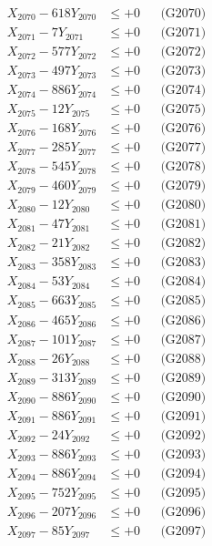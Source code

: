 \documentclass[a4paper,10pt]{article}
\begin{document}
{\begin{align}
X_{2070} - 618Y_{2070} &\leq +0 && \text{(G2070)} \\
\allowbreak
X_{2071} - 7Y_{2071} &\leq +0 && \text{(G2071)} \\
X_{2072} - 577Y_{2072} &\leq +0 && \text{(G2072)} \\
X_{2073} - 497Y_{2073} &\leq +0 && \text{(G2073)} \\
X_{2074} - 886Y_{2074} &\leq +0 && \text{(G2074)} \\
X_{2075} - 12Y_{2075} &\leq +0 && \text{(G2075)} \\
X_{2076} - 168Y_{2076} &\leq +0 && \text{(G2076)} \\
X_{2077} - 285Y_{2077} &\leq +0 && \text{(G2077)} \\
X_{2078} - 545Y_{2078} &\leq +0 && \text{(G2078)} \\
X_{2079} - 460Y_{2079} &\leq +0 && \text{(G2079)} \\
X_{2080} - 12Y_{2080} &\leq +0 && \text{(G2080)} \\
\allowbreak
X_{2081} - 47Y_{2081} &\leq +0 && \text{(G2081)} \\
X_{2082} - 21Y_{2082} &\leq +0 && \text{(G2082)} \\
X_{2083} - 358Y_{2083} &\leq +0 && \text{(G2083)} \\
X_{2084} - 53Y_{2084} &\leq +0 && \text{(G2084)} \\
X_{2085} - 663Y_{2085} &\leq +0 && \text{(G2085)} \\
X_{2086} - 465Y_{2086} &\leq +0 && \text{(G2086)} \\
X_{2087} - 101Y_{2087} &\leq +0 && \text{(G2087)} \\
X_{2088} - 26Y_{2088} &\leq +0 && \text{(G2088)} \\
X_{2089} - 313Y_{2089} &\leq +0 && \text{(G2089)} \\
X_{2090} - 886Y_{2090} &\leq +0 && \text{(G2090)} \\
\allowbreak
X_{2091} - 886Y_{2091} &\leq +0 && \text{(G2091)} \\
X_{2092} - 24Y_{2092} &\leq +0 && \text{(G2092)} \\
X_{2093} - 886Y_{2093} &\leq +0 && \text{(G2093)} \\
X_{2094} - 886Y_{2094} &\leq +0 && \text{(G2094)} \\
X_{2095} - 752Y_{2095} &\leq +0 && \text{(G2095)} \\
X_{2096} - 207Y_{2096} &\leq +0 && \text{(G2096)} \\
X_{2097} - 85Y_{2097} &\leq +0 && \text{(G2097)} \\

\end{align}}
\end{document}
